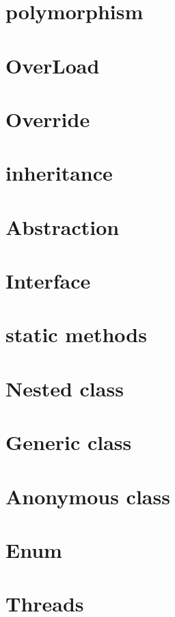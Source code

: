 \documentclass[openany]{book}
\newenvironment{AR}{
  \begin{RLtext}
        }{
  \end{RLtext}
}
\begin{document}
\section{polymorphism}
\section{OverLoad}
\section{Override}
\section{inheritance}
\section{Abstraction}
\section{Interface}
\section{static methods}
\section{Nested class}
\section{Generic class}
\section{Anonymous class}
\section{Enum}
\section{Threads}
\LR{}
\begin{AR}

\end{AR}
\begin{verbatim}
  
\end{verbatim}
\end{document}
